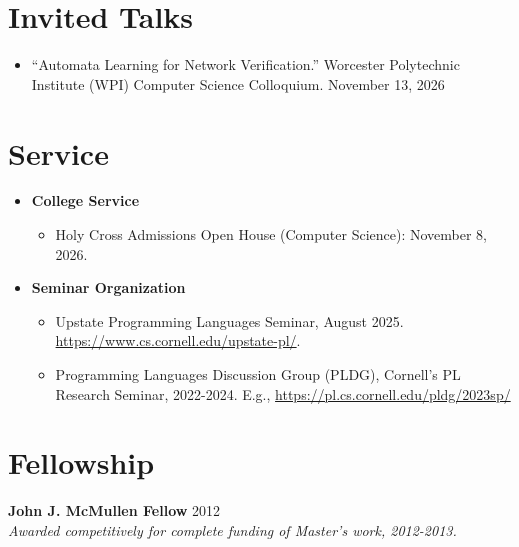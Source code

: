 \documentclass[11pt]{article}
\begin{document}
\section*{Invited Talks}
\begin{itemize}
\item ``Automata Learning for Network Verification.'' Worcester Polytechnic Institute (WPI) Computer Science Colloquium. \hfill{November 13, 2026}
\end{itemize}

\section*{Service}
\begin{itemize}
\item[] \textbf{College Service}
\begin{itemize}
\item Holy Cross Admissions Open House (Computer Science): November 8, 2026.
\end{itemize}

\item[] \textbf{Seminar Organization}
\begin{itemize}
\item Upstate Programming Languages Seminar, August 2025. \href{https://www.cs.cornell.edu/upstate-pl}{https://www.cs.cornell.edu/upstate-pl/}.
\item Programming Languages Discussion Group (PLDG), Cornell's PL Research Seminar, 2022-2024. E.g.,
\href{https://pl.cs.cornell.edu/pldg/2023sp/}{https://pl.cs.cornell.edu/pldg/2023sp/}
\end{itemize}
\end{itemize}

\section*{Fellowship}

\textbf{John J. McMullen Fellow} \hfill{2012}\\
{\em Awarded competitively for complete funding of Master's work, 2012-2013.}

\thispagestyle{plain}

\end{document}

